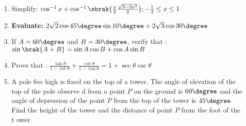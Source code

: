 
\begin{enumerate}
\item Simplify: $\cos^{-1}x + \cos^{-1}\sbrak{\frac{x}{2}{\frac{\sqrt{3-3x^2}}{2}}};-\frac{1}{2} \leq x \leq 1$

\item\textbf{ Evaluate:} $2\sqrt{2} \cos 45\degree \sin 10\degree + 2\sqrt{3} \cos 30\degree$

\item If  $A = 60\degree$ and  $B = 30\degree$, verify that : $\sin\brak{A + B} = \sin A \cos B + \cos A \sin B$

\item Prove that : $\frac{\tan{\theta}}{1 - \cot{\theta}} + \frac{\cot{\theta}}{1 - \tan{\theta}} = 1 + \sec
{\theta}\csc{\theta}$
\item A pole $6m$ high is fixed on the top of a tower. The angle of elevation of the top of the pole observe
d from a point $P$ on the ground is $60\degree$ and the angle of depression of the point $P$ from the top of
 the tower is $45\degree$. Find the height of the tower and the distance of point $P$ from the foot of the t
ower


\end{enumerate}

